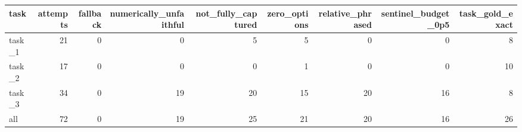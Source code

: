 \begin{tabular}{lrrrrrrrr}
\toprule
  task &  attempts &  fallback &  numerically\_unfaithful &  not\_fully\_captured &  zero\_options &  relative\_phrased &  sentinel\_budget\_0p5 &  task\_gold\_exact \\
\midrule
task\_1 &        21 &         0 &                       0 &                   5 &             5 &                 0 &                    0 &                8 \\
task\_2 &        17 &         0 &                       0 &                   0 &             1 &                 0 &                    0 &               10 \\
task\_3 &        34 &         0 &                      19 &                  20 &            15 &                20 &                   16 &                8 \\
   all &        72 &         0 &                      19 &                  25 &            21 &                20 &                   16 &               26 \\
\bottomrule
\end{tabular}

